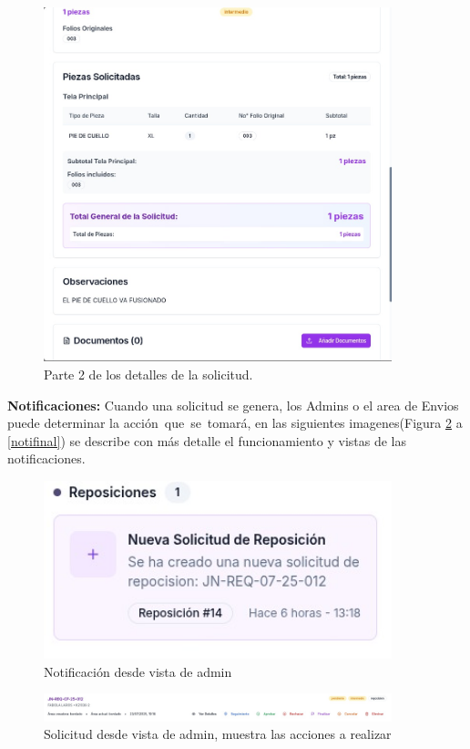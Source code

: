 \documentclass[12pt,letterpaper,spanish]{report}
\begin{document}
\begin{figure}[H]
    \centering
    \includegraphics[width=0.9\textwidth]{detalles_rep2.jpg}
    \caption{Parte 2 de los detalles de la solicitud.}
    \label{fig:detalles2}
\end{figure}
 \textbf{Notificaciones:}
 Cuando una solicitud se genera, los Admins o el area de Envios puede determinar la acción que se tomará, en las siguientes imagenes(Figura \ref{noti1} a \ref{notifinal}) se describe con más detalle el funcionamiento y vistas de las notificaciones.
 \begin{figure}
   \centering
   \includegraphics[width=0.9\textwidth]{noti1.jpg}
   \caption{Notificación desde vista de admin}\label{noti1}
 \end{figure}

 \begin{figure}
   \centering
   \includegraphics[width=0.9\textwidth]{admvista.jpg}
   \caption{Solicitud desde vista de admin, muestra las acciones a realizar}\label{admvista}
 \end{figure}
\end{document}
